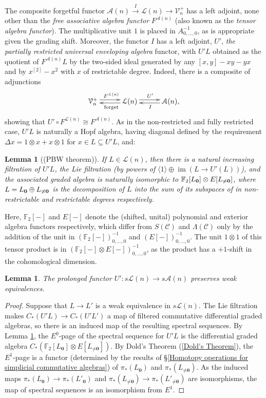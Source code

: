 \documentclass[11pt]{amsart} \renewcommand{\baselinestretch}{1.2}
\theoremstyle{plain}
\newtheorem{lem}[thm]{Lemma}
\numberwithin{equation}{section} %
\theoremstyle{plain}
\newtheorem{lem}[thm]{Lemma}
\numberwithin{equation}{chapter} %
\DeclareMathOperator{\im}{im}
\newcommand{\DASH}{\mathrm{-}}
\renewcommand{\to}{\longrightarrow}
\newcommand{\scrC}{\mathscr{C}}
\newcommand{\calA}{\mathcal{A}}
\newcommand{\calL}{\mathcal{L}}
\newcommand{\calV}{\mathcal{V}}
\newcommand{\CommOperad}{{\scrC}}
\newcommand{\restn}[1]{#1^{[2]}}
\newcommand{\vect}[2]{\calV^{#1}_{#2}}
\newcommand{\UEA}{U'}%
\newcommand{\F}{\mathbb{F}}
\newcommand{\Ftwo}{\F_2}
\begin{document}
\begin{appendices}
The composite forgetful functor $\calA(n)\overset{I}{\to}\calL(n)\to\vect{+}{n}$ has a left adjoint, none other than the \emph{free associative algebra functor} $F^{\calA(n)}$ (also known as the \emph{tensor algebra functor}). The multiplicative unit $1$ is placed in $A^{-1}_{0,\ldots,0}$, as is appropriate given the grading shift. Moreover, the functor $I$ has a left adjoint, $\UEA$, \emph{the partially restricted universal enveloping algebra} functor, with $\UEA L$ obtained as the quotient of $F^{\calA(n)}L$ by the two-sided ideal generated by any $[x,y]-xy-yx$ and by $\restn{x}-x^2$ with $x$ of restrictable degree. Indeed, there is a composite of adjunctions
\[\xymatrix@R=.3cm@C=1cm{
\vect{+}{n}  \ar@<.6ex>[r]^{F^{\calL(n)}}&
\calL(n)  \ar@<.4ex>[l]^{\textup{forget}} \ar@<.6ex>[r]^{\UEA}&
\calA(n),  \ar@<.4ex>[l]^{I} 
}
\]
showing that $\UEA\circ F^{\calL(n)}\cong F^{\calA(n)}$. As in the non-restricted and fully restricted case, $\UEA L$ is naturally a Hopf algebra, having diagonal defined by the requirement $\Delta x=1\otimes x+x\otimes 1$ for $x\in L\subseteq \UEA L$, and:
\begin{lem}[(PBW theorem)]\label{Partially restricted PBW Theorem}
If $L\in\calL(n)$, then there is a natural increasing filtration of $\UEA L$, the Lie filtration (by powers of $\langle 1\rangle\oplus \im(L\to \UEA(L))$), and the associated graded algebra is naturally isomorphic to $\Ftwo [L_{\textup{\textbf{0}}}]\otimes E[L_{\neq\textup{\textbf{0}}}]$, where $L=L_{\textbf{\textup{0}}}\oplus L_{\neq\textbf{\textup{0}}}$ is the decomposition of $L$ into the sum of its subspaces of in non-restrictable and restrictable degrees respectively.
\end{lem}
Here, $\Ftwo [\DASH]$ and $E[\DASH]$ denote the (shifted, unital) polynomial and exterior algebra functors respectively, which differ from $S(\CommOperad)$ and $\Lambda(\CommOperad)$ only by the addition of the unit in $(\Ftwo [\DASH])^{-1}_{0,\ldots,0}$ and $(E[\DASH])^{-1}_{0,\ldots,0}$. The unit $1\otimes1 $ of this tensor product is in $(\Ftwo [\DASH]\otimes E[\DASH])^{-1}_{0,\ldots,0}$, as the product has a $+1$-shift in the cohomological dimension.
\begin{lem}
The prolonged functor $\UEA:s\calL(n)\to s\calA(n)$ preserves weak equivalences.
\end{lem}
\begin{proof}
Suppose that $L\to L'$ is a weak equivalence in $s\calL(n)$. The Lie filtration makes $C_*(\UEA L)\to C_*(\UEA L')$ a map of filtered commutative differential graded algebras, so there is an induced map of the resulting spectral sequences. By Lemma \ref{Partially restricted PBW Theorem}, the $E^0$-page of the spectral sequence for $\UEA L$ is the differential graded algebra $C_*(\Ftwo [L_{\textbf{0}}]\otimes E[L_{\neq\textbf{0}}])$. By Dold's Theorem (\ref{Dold's Theorem}), the $E^1$-page is a functor (determined by the results of \S\ref{Homotopy operations for simplicial commutative algebras}) of $\pi_*(L_{\textbf{0}})$ and $\pi_*(L_{\neq\textbf{0}})$. As the induced maps $\pi_*(L_{\textbf{0}})\to\pi_*(L'_{\textbf{0}})$ and $\pi_*(L_{\neq\textbf{0}})\to\pi_*(L'_{\neq\textbf{0}})$ are isomorphisms, the map of spectral sequences is an isomorphism from $E^1$.

\end{proof}
\end{appendices}
\end{document}
